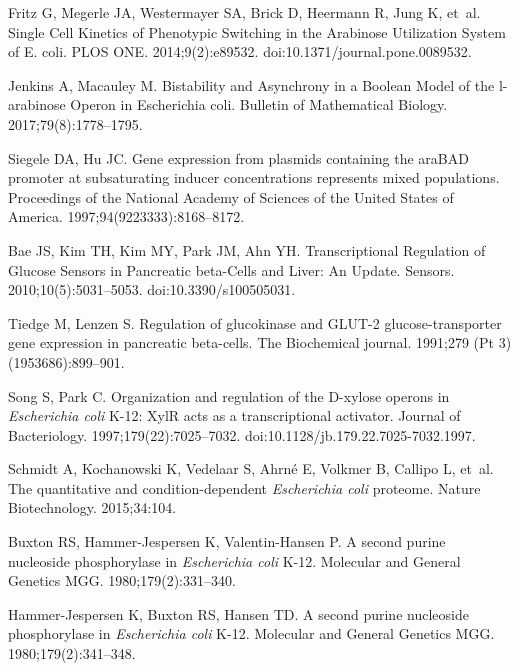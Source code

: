 \documentclass[10pt,letterpaper]{article}
\begin{document}
\begin{thebibliography}{10}
		Fritz G, Megerle JA, Westermayer SA, Brick D, Heermann R, Jung K, et~al.
		\newblock Single Cell Kinetics of Phenotypic Switching in the Arabinose
		Utilization System of E. coli.
		\newblock PLOS ONE. 2014;9(2):e89532.
		\newblock doi:{10.1371/journal.pone.0089532}.
		
		Jenkins A, Macauley M.
		\newblock Bistability and Asynchrony in a Boolean Model of the l-arabinose
		Operon in Escherichia coli.
		\newblock Bulletin of Mathematical Biology. 2017;79(8):1778--1795.
		
		Siegele DA, Hu JC.
		\newblock Gene expression from plasmids containing the araBAD promoter at
		subsaturating inducer concentrations represents mixed populations.
		\newblock Proceedings of the National Academy of Sciences of the United States
		of America. 1997;94(9223333):8168--8172.
		
		Bae JS, Kim TH, Kim MY, Park JM, Ahn YH.
		\newblock Transcriptional Regulation of Glucose Sensors in Pancreatic
		beta-Cells and Liver: An Update.
		\newblock Sensors. 2010;10(5):5031–5053.
		\newblock doi:{10.3390/s100505031}.
		
		Tiedge M, Lenzen S.
		\newblock Regulation of glucokinase and GLUT-2 glucose-transporter gene
		expression in pancreatic beta-cells.
		\newblock The Biochemical journal. 1991;279 (Pt 3)(1953686):899--901.
		
		Song S, Park C.
		\newblock Organization and regulation of the D-xylose operons in \emph{Escherichia
		coli} K-12: XylR acts as a transcriptional activator.
		\newblock Journal of Bacteriology. 1997;179(22):7025--7032.
		\newblock doi:{10.1128/jb.179.22.7025-7032.1997}.
		
		Schmidt A, Kochanowski K, Vedelaar S, Ahrné E, Volkmer B, Callipo L, et~al.
		\newblock The quantitative and condition-dependent \emph{Escherichia coli} proteome.
		\newblock Nature Biotechnology. 2015;34:104.
		
		Buxton RS, Hammer-Jespersen K, Valentin-Hansen P.
		\newblock A second purine nucleoside phosphorylase in \emph{Escherichia coli}
		K-12.
		\newblock Molecular and General Genetics MGG. 1980;179(2):331--340.
		
		Hammer-Jespersen K, Buxton RS, Hansen TD.
		\newblock A second purine nucleoside phosphorylase in \emph{Escherichia coli}
		K-12.
		\newblock Molecular and General Genetics MGG. 1980;179(2):341--348.
		

\end{thebibliography}
\end{document}
